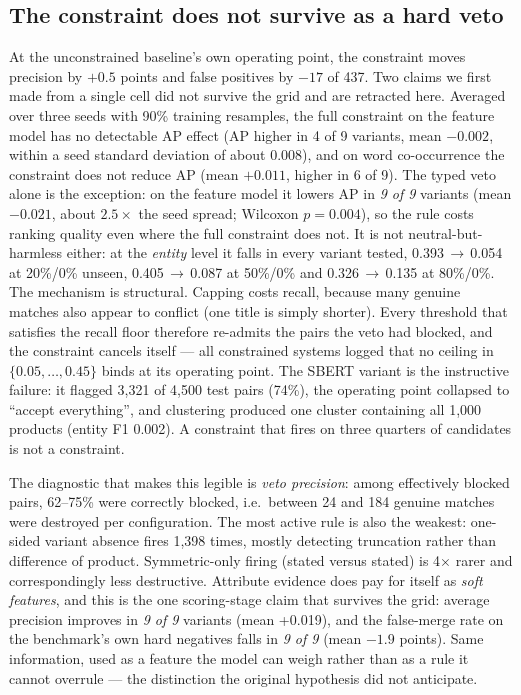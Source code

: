 \documentclass[conference]{IEEEtran}
\begin{document}
\subsection{The constraint does not survive as a hard veto}
\label{sec:negative}
At the unconstrained baseline's own operating point, the constraint moves precision by $+0.5$ points and
false positives by $-17$ of 437. Two claims we first made from a single cell did not survive the grid and are
retracted here. Averaged over three seeds with 90\% training resamples, the full constraint on the feature
model has no detectable AP effect (AP higher in 4 of 9 variants, mean $-0.002$, within a seed standard
deviation of about 0.008), and on word co-occurrence the constraint does not reduce AP (mean $+0.011$,
higher in 6 of 9). The typed veto alone is the exception: on the feature model it lowers AP in \emph{9 of 9}
variants (mean $-0.021$, about $2.5\times$ the seed spread; Wilcoxon $p=0.004$), so the rule costs ranking
quality even where the full constraint does not. It is not neutral-but-harmless either: at the \emph{entity} level it
falls in every variant tested, 0.393\,$\rightarrow$\,0.054 at 20\%/0\% unseen, 0.405\,$\rightarrow$\,0.087 at
50\%/0\% and 0.326\,$\rightarrow$\,0.135 at 80\%/0\%. The mechanism is structural. Capping costs recall,
because many genuine matches also appear to conflict (one title is simply shorter). Every threshold that
satisfies the recall floor therefore re-admits the pairs the veto had blocked, and the constraint cancels
itself --- all constrained systems logged that no ceiling in $\{0.05,\dots,0.45\}$ binds at its operating
point. The SBERT variant is the instructive failure: it flagged 3{,}321 of 4{,}500 test pairs (74\%), the
operating point collapsed to ``accept everything'', and clustering produced one cluster containing all
1{,}000 products (entity F1 0.002). A constraint that fires on three quarters of candidates is not a
constraint.


The diagnostic that makes this legible is \emph{veto precision}: among effectively blocked pairs, 62--75\%
were correctly blocked, i.e.\ between 24 and 184 genuine matches were destroyed per configuration. The most active rule
is also the weakest: one-sided variant absence fires 1{,}398 times, mostly detecting truncation rather than
difference of product. Symmetric-only firing (stated versus stated) is 4$\times$ rarer and correspondingly
less destructive. Attribute evidence does pay for itself as \emph{soft features}, and this is the one
scoring-stage claim that survives the grid: average precision improves in \emph{9 of 9} variants (mean
+0.019), and the false-merge rate on the benchmark's own hard negatives falls in \emph{9 of 9} (mean
$-1.9$ points). Same information, used as a feature the model can weigh rather than as a rule it cannot
overrule --- the distinction the original hypothesis did not anticipate.
\end{document}
